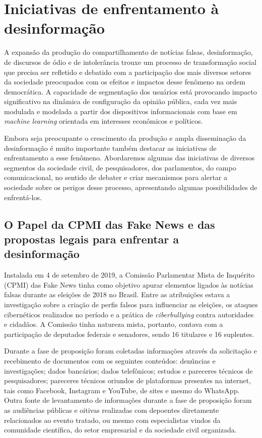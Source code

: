 \section{Iniciativas de enfrentamento à desinformação}

A expansão da produção do compartilhamento de notícias falsas,
desinformação, de discursos de ódio e de intolerância trouxe um processo
de transformação social que precisa ser refletido e debatido com a
participação dos mais diversos setores da sociedade preocupados com os
efeitos e impactos desse fenômeno na ordem democrática. A capacidade de
segmentação dos usuários está provocando impacto significativo na
dinâmica de configuração da opinião pública, cada vez mais modulada e
modelada a partir dos dispositivos informacionais com base em
\emph{machine} \emph{learning} orientada em interesses econômicos e
políticos.

Embora seja preocupante o crescimento da produção e ampla disseminação
da desinformação é muito importante também destacar as iniciativas de
enfrentamento a esse fenômeno. Abordaremos algumas das iniciativas de
diversos segmentos da sociedade civil, de pesquisadores, dos
parlamentos, do campo comunicacional, no sentido de debater e criar
mecanismos para alertar a sociedade sobre os perigos desse processo,
apresentando algumas possibilidades de enfrentá-los.

\subsection{O Papel da CPMI das Fake News e das propostas legais para enfrentar a desinformação}

Instalada em 4 de setembro de 2019, a Comissão Parlamentar Mista de
Inquérito (CPMI) das Fake News tinha como objetivo apurar elementos
ligados às notícias falsas durante as eleições de 2018 no Brasil. Entre
as atribuições estava a investigação sobre a criação de perfis falsos
para influenciar as eleições, os ataques cibernéticos realizados no
período e a prática de \emph{ciberbullying} contra autoridades e
cidadãos. A Comissão tinha natureza mista, portanto, contava com a
participação de deputados federais e senadores, sendo 16 titulares e 16
suplentes.

Durante a fase de proposição foram coletadas informações através da
solicitação e recebimento de documentos com os seguintes conteúdos:
denúncias e investigações; dados bancários; dados telefônicos; estudos e
pareceres técnicos de pesquisadores; pareceres técnicos oriundos de
plataformas presentes na internet, tais como Facebook, Instagram e
YouTube, de sites e mesmo do WhatsApp. Outra fonte de levantamento de
informações durante a fase de proposição foram as audiências públicas e
oitivas realizadas com depoentes diretamente relacionados ao evento
tratado, ou mesmo com especialistas vindos da comunidade científica, do
setor empresarial e da sociedade civil organizada.

